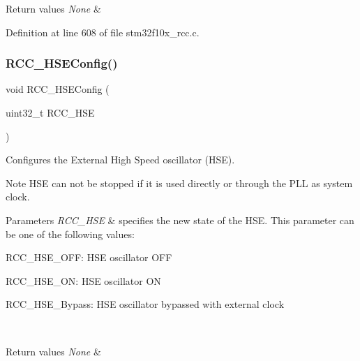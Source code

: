 \begin{DoxyRetVals}{Return values}
{\em None} & \\
\hline
\end{DoxyRetVals}


Definition at line 608 of file stm32f10x\+\_\+rcc.\+c.

\mbox{\label{group___r_c_c___exported___functions_ga432b3281546d23345642d55f8670a93d}} 
\subsubsection{\texorpdfstring{R\+C\+C\+\_\+\+H\+S\+E\+Config()}{RCC\_HSEConfig()}}
{\footnotesize\ttfamily void R\+C\+C\+\_\+\+H\+S\+E\+Config (\begin{DoxyParamCaption}\item[{uint32\+\_\+t}]{R\+C\+C\+\_\+\+H\+SE }\end{DoxyParamCaption})}



Configures the External High Speed oscillator (H\+SE). 

\begin{DoxyNote}{Note}
H\+SE can not be stopped if it is used directly or through the P\+LL as system clock. 
\end{DoxyNote}

\begin{DoxyParams}{Parameters}
{\em R\+C\+C\+\_\+\+H\+SE} & specifies the new state of the H\+SE. This parameter can be one of the following values\+: \begin{DoxyItemize}
\item R\+C\+C\+\_\+\+H\+S\+E\+\_\+\+O\+FF\+: H\+SE oscillator O\+FF \item R\+C\+C\+\_\+\+H\+S\+E\+\_\+\+ON\+: H\+SE oscillator ON \item R\+C\+C\+\_\+\+H\+S\+E\+\_\+\+Bypass\+: H\+SE oscillator bypassed with external clock \end{DoxyItemize}
\\
\hline
\end{DoxyParams}

\begin{DoxyRetVals}{Return values}
{\em None} & \\
\hline
\end{DoxyRetVals}


